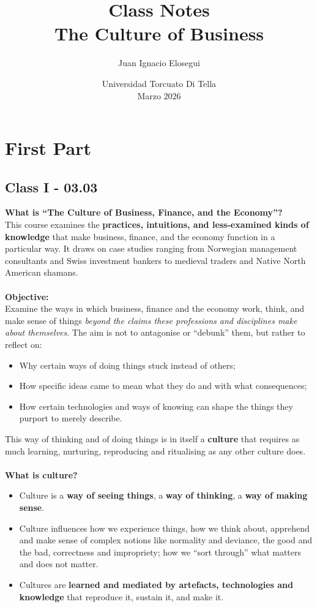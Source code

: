 \documentclass[a4paper,12pt]{article}
\title{\vspace{-2cm}\textbf{Class Notes}\\[0.2cm]
\large The Culture of Business}
\author{Juan Ignacio Elosegui}
\date{Universidad Torcuato Di Tella \\ Marzo 2026}
\begin{document}
\maketitle
\section*{First Part}
\subsection*{Class I - 03.03}
\noindent \textbf{What is ``The Culture of Business, Finance, and the Economy''?} \\
\noindent This course examines the \textbf{practices, intuitions, and less-examined kinds of knowledge} that make business, finance, and the economy function in a particular way. It draws on case studies ranging from Norwegian management consultants and Swiss investment bankers to medieval traders and Native North American shamans. \\
\\
\noindent \textbf{Objective:} \\
Examine the ways in which business, finance and the economy work, think, and make sense of things \emph{beyond the claims these professions and disciplines make about themselves}. The aim is not to antagonise or ``debunk'' them, but rather to reflect on:
\begin{itemize}
	\item Why certain ways of doing things stuck instead of others;
	\item How specific ideas came to mean what they do and with what consequences;
	\item How certain technologies and ways of knowing can shape the things they purport to merely describe.
\end{itemize}

\noindent This way of thinking and of doing things is in itself a \textbf{culture} that requires as much learning, nurturing, reproducing and ritualising as any other culture does. \\
\\
\noindent \textbf{What is culture?}
\begin{itemize}
	\item Culture is a \textbf{way of seeing things}, a \textbf{way of thinking}, a \textbf{way of making sense}.
	\item Culture influences how we experience things, how we think about, apprehend and make sense of complex notions like normality and deviance, the good and the bad, correctness and impropriety; how we ``sort through'' what matters and does not matter.
	\item Cultures are \textbf{learned and mediated by artefacts, technologies and knowledge} that reproduce it, sustain it, and make it. \\
\end{itemize}
\end{document}
